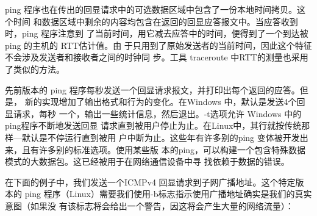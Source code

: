ping 程序也在传出的回显请求中的可选数据区域中包含了一份本地时间拷贝。这个时间
和数据区域中剩余的内容均包含在返回的回显应答报文中。当应答收到时，ping 程序注意到
了当前时间，用它减去应答中的时间，便得到了一个到达被 ping 的主机的 RTT估计值。由
于只用到了原始发送者的当前时间，因此这个特征不会涉及发送者和接收者之间的时钟同
步。工具 traceroute 中RTT的测量也采用了类似的方法。

先前版本的 ping 程序每秒发送一个回显请求报文，并打印出每个返回的应答。但是，
新的实现增加了输出格式和行为的变化。在Windows 中，默认是发送4个回显请求，每秒
一个，输出一些统计信息，然后退出。-t选项允许 Windows 中的ping程序不断地发送回显
请求直到被用户停止为止。在Linux中，其行就按传统那样—默认是不停运行直到被用
户中断为止。这些年有许多别的ping 变体被开发出来，且有许多别的标准选项。使用某些版
本的ping，可以构建一个包含特殊数据模式的大数据包。这已经被用于在网络通信设备中寻
找依赖于数据的错误。

在下面的例子中，我们发送一个ICMPv4 回显请求到子网广播地址。这个特定版本的
ping 程序（Linux）需要我们使用-b标志指示使用广播地址确实是我们的真实意图（如果没
有该标志将会给出一个警告，因这将会产生大量的网络流量）：

